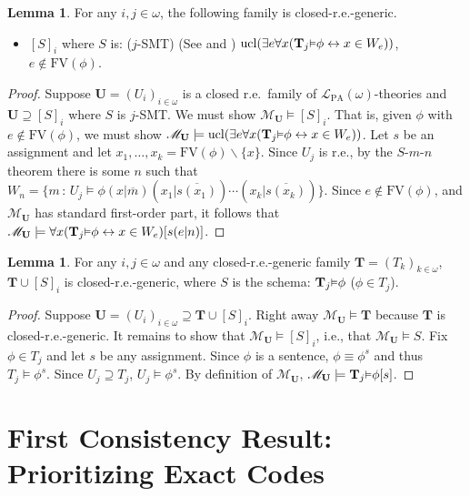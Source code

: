 \documentclass[reqno]{article}
\theoremstyle{definition}
\newtheorem{lemma}[theorem]{Lemma}
\def\L{\mathscr{L}}
\def\M{\mathscr{M}}
\def\T{\mathbf{T}}
\def\U{\mathbf{U}}
\def\FV{\mathrm{FV}}
\def\LPA{\L_{\mathrm{PA}}}
\renewcommand{\Pr}[1]{\T_{#1}\mbox{\small${\vDash}$}}
\newcommand{\ucl}[1]{\mathrm{ucl}(#1)}
\begin{document}
\begin{lemma}
\label{firstutilbagsmt}
For any $i,j\in\omega$, the following family is closed-r.e.-generic.
\begin{itemize}
\item $[S]_i$ where $S$ is: ($j$-SMT)
(See \cite{carlson2000} and \cite{reinhardt}) $\ucl{\exists e\forall x(\Pr 
j\phi\leftrightarrow x\in W_e)}$, $e\not\in\FV(\phi)$.
\end{itemize}
\end{lemma}

\begin{proof}
Suppose $\U=(U_i)_{i\in\omega}$ is a closed r.e.~family of
$\LPA(\omega)$-theories and $\U\supseteq [S]_i$ where $S$ is $j$-SMT.
We must show $\M_{\U}\models [S]_i$.
That is, given $\phi$ with $e\not\in\FV(\phi)$, we must show
$\M_{\U}\models \ucl{\exists e \forall x (\Pr j \phi \leftrightarrow x\in W_e)}$.
Let $s$ be an assignment and let $x_1,\ldots,x_k=\FV(\phi)\backslash\{x\}$.
Since $U_j$ is r.e., by the $S$-$m$-$n$ theorem there is some $n$
such that $W_n=\{m\,:\,U_j\models \phi(x|\overline{m})(x_1|\overline{s(x_1)})
\cdots (x_k|\overline{s(x_k)})\}$.  Since $e\not\in\FV(\phi)$, and $\M_{\U}$ has
standard first-order part, it follows that
$\M_{\U}\models \forall x(\Pr j \phi\leftrightarrow x\in W_e)[s(e|n)]$.
\end{proof}

\begin{lemma}
\label{firstutilbagclosure}
For any $i,j\in\omega$ and any closed-r.e.-generic family $\T=(T_k)_{k\in\omega}$,
$\T\cup [S]_i$ is closed-r.e.-generic,
where $S$ is the schema: $\Pr j\phi$ ($\phi\in T_j$).
\end{lemma}

\begin{proof}
Suppose $\U=(U_i)_{i\in\omega}\supseteq \T\cup [S]_i$.
Right away $\M_{\U}\models \T$
because $\T$ is closed-r.e.-generic.  It remains to show that
$\M_{\U}\models [S]_i$, i.e., that $\M_{\U}\models S$.
Fix $\phi\in T_j$ and let $s$ be any assignment.  Since $\phi$ is a sentence,
$\phi\equiv\phi^s$ and thus
$T_j\models\phi^s$.  Since $U_j\supseteq T_j$, $U_j\models\phi^s$.
By definition of $\M_{\U}$, $\M_{\U}\models \Pr j\phi[s]$.
\end{proof}

\section{First Consistency Result: Prioritizing Exact Codes}
\end{document}
